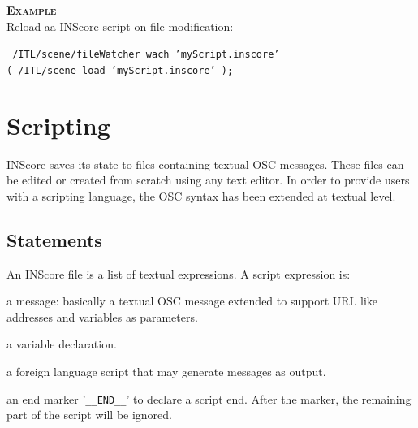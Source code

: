 \documentclass[a4paper,twoside]{report}
\newcommand{\toplevel}[1]	{\chapter{#1}}
\newcommand{\sublevel}[1]	{\section{#1}}
\newcommand{\OSC}[1]		{\texttt{#1}}
\newcommand{\example}		{\textbf{\hspace{-1.5cm}\textbf{\textsc{Example }}}}
\let\olditemize\itemize
\let\oldenditemize\enditemize
\renewenvironment{itemize} 	{\olditemize \setlength{\itemsep}{1mm}}{\oldenditemize}
\newcommand{\sample}	[1]			{\vspace{-2mm}\begin{center}\colorbox{mygrey}{
								\begin{minipage}[t]{0.9\columnwidth} 
								{\small \texttt{#1}}
								\end{minipage}}\end{center}}
\begin{document}
\example \\
Reload aa INScore script on file modification:
\sample{
/ITL/scene/fileWatcher wach 'myScript.inscore' \\
\hspace*{3cm}( /ITL/scene load 'myScript.inscore' );
}

%
%
%



\toplevel{Scripting}
\label{scripting}

INScore saves its state to files containing textual OSC messages. These files can be edited or created from scratch using any text editor. In order to provide users with a scripting language, the OSC syntax has been extended at textual level.

\sublevel{Statements}\label{scriptstatement}
An INScore file is a list of textual expressions. A script expression is:
\begin{itemize}
\item a message: basically a textual OSC message extended to support URL like addresses and variables as parameters.
\item a variable declaration.
\item a foreign language script that may generate messages as output.
\item an end marker '\OSC{\_\_END\_\_}' to declare a script end. After the marker, the remaining part of the script will be ignored.
\end{itemize}
\end{document}
